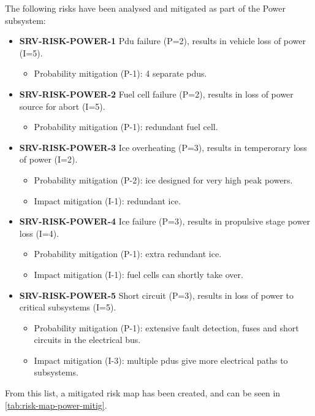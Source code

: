 \noindent The following risks have been analysed and mitigated as part of the Power subsystem:

\begin{itemize}
	 \item \textbf{SRV-RISK-POWER-1} Pdu failure (P=2), results in vehicle loss of power (I=5).
	\begin{itemize}
		 \item Probability mitigation (P-1): 4 separate pdus.	\end{itemize}
	 \item \textbf{SRV-RISK-POWER-2} Fuel cell failure (P=2), results in loss of power source for abort (I=5).
	\begin{itemize}
		 \item Probability mitigation (P-1): redundant fuel cell.	\end{itemize}
	 \item \textbf{SRV-RISK-POWER-3} Ice overheating (P=3), results in temperorary loss of power (I=2).
	\begin{itemize}
		 \item Probability mitigation (P-2): ice designed for very high peak powers.		 \item Impact mitigation (I-1):  redundant ice.	\end{itemize}
	 \item \textbf{SRV-RISK-POWER-4} Ice failure (P=3), results in propulsive stage power loss (I=4).
	\begin{itemize}
		 \item Probability mitigation (P-1):  extra redundant ice.		 \item Impact mitigation (I-1):  fuel cells can shortly take over.	\end{itemize}
	 \item \textbf{SRV-RISK-POWER-5} Short circuit (P=3), results in loss of power to critical subsystems (I=5).
	\begin{itemize}
		 \item Probability mitigation (P-1): extensive fault detection, fuses and short circuits in the electrical bus.		 \item Impact mitigation (I-3): multiple pdus give more electrical paths to subsystems.	\end{itemize}
\end{itemize}

\noindent From this list, a mitigated risk map has been created, and can be seen in \autoref{tab:risk-map-power-mitig}.

